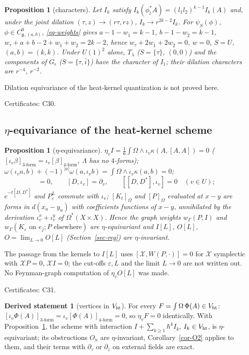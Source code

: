 \documentclass[10pt,a4paper]{article}
\numberwithin{equation}{section}
\newtheorem{proposition}[theorem]{Proposition}
\theoremstyle{definition}
\newtheorem{dstatement}[theorem]{Derived statement}
\theoremstyle{remark}
\newcommand{\g}{\mathfrak g}
\newcommand{\zb}{\bar z}
\newcommand{\Vht}{V_{\rm ht}}
\newcommand{\Cg}{C^0_{\g}}
\newcommand{\cert}[1]{\par\noindent\textup{Certificates: #1.}\par}
\begin{document}
\begin{proposition}[characters]\label{prop-chars}
Let $I_k$ satisfy $I_k(\phi_l^*A)=(l_1l_2)^{k-1}I_k(A)$ and, under the joint dilation $(\tau,z)\to(r\tau,rz)$, $I_k\to r^{2k-2}I_k$. For $\psi_S(\phi)$, $\phi\in\Cg{}_{,(a,b)}$, \eqref{eq-weights} gives $a-1-w_{\bar1}=k-1$, $b-1-w_{\bar2}=k-1$, $w_\tau+a+b-2+w_{\bar1}+w_{\bar2}=2k-2$, hence $w_\tau+2w_{\bar1}+2w_{\bar2}=0$, $w=0$, $S=U$, $(a,b)=(k,k)$. Under $U(1)^2$ alone, $T_\lambda$ ($S=\{\tau\}$, $(0,0)$) and the components of $G_\epsilon$ ($S=\{\tau,\bar i\}$) have the character of $I_1$; their dilation characters are $r^{-4}$, $r^{-2}$.
\end{proposition}
Dilation equivariance of the heat-kernel quantization is not proved here.
\cert{C30}

\subsection{\texorpdfstring{$\eta$-equivariance of the heat-kernel scheme}{eta-equivariance of the heat-kernel scheme}}\label{sec-eta}

\begin{proposition}[$\eta$-equivariance]\label{prop-eta}
$\eta_vI=\frac16\int\Omega\wedge\iota_v\kappa(A,[A,A])=0$ ($[\iota_v\beta]_{3\text{-form}}=\iota_v[\beta]_{4\text{-form}}$, $\Lambda$ has no $4$-forms); $\omega(\iota_va,b)+(-1)^{|a|}\omega(a,\iota_vb)=\int\Omega\wedge\iota_v\kappa(a,b)=0$;
\begin{equation}
[D^*,\iota_v]=0,\qquad [D,\iota_v]=\partial_v,\qquad [[D,D^*],\iota_v]=0\quad(v\in U);
\end{equation}
$e^{-t[D,D^*]}$ and $P^L_\varepsilon$ commute with $\iota_v$; $[K_t]_\Omega$ and $[P]_\Omega$ evaluated at $x-y$ are forms in $d(x_u-y_u)$ with coefficients functions of $x-y$, annihilated by the derivation $\iota^x_v+\iota^y_v$ of $\Omega^*(X\times X)$. Hence the graph weights $w_\Gamma(P,I)$ and $w_\Gamma(K_\varepsilon\text{ on }e_j;P\text{ elsewhere})$ are $\eta$-equivariant and $I[L]$, $O[L]$, $O=\lim_{L\to0}O[L]$ (Section~\ref{sec-reg}) are $\eta$-invariant.
\end{proposition}
The passage from the kernels to $I[L]$ uses $[\mathcal X,W(P,\cdot)]=0$ for $\mathcal X$ symplectic with $\mathcal X P=0$, $\mathcal XI=0$; the cut-offs $\varepsilon,L$ and the limit $L\to0$ are not written out. No Feynman-graph computation of $\eta_vO[L]$ was made.
\cert{C31}

\begin{dstatement}[vertices in $\Vht$]\label{ds-Vht-eta}
For every $F=\int\Omega\,\Phi(A)\in\Vht$: $[\iota_v\Phi(A)]_{3\text{-form}}=\iota_v[\Phi(A)]_{4\text{-form}}=0$, so $\eta_vF=0$ identically. With Proposition~\ref{prop-eta}, the scheme with interaction $I+\sum_{k\ge1}\hbar^kI_k$, $I_k\in\Vht$, is $\eta$-equivariant; its obstructions $O_n$ are $\eta$-invariant, Corollary~\ref{cor-O2} applies to them, and their terms with $\partial_\tau$ or $\partial_{\zb}$ on external fields are exact.
\end{dstatement}
\end{document}
